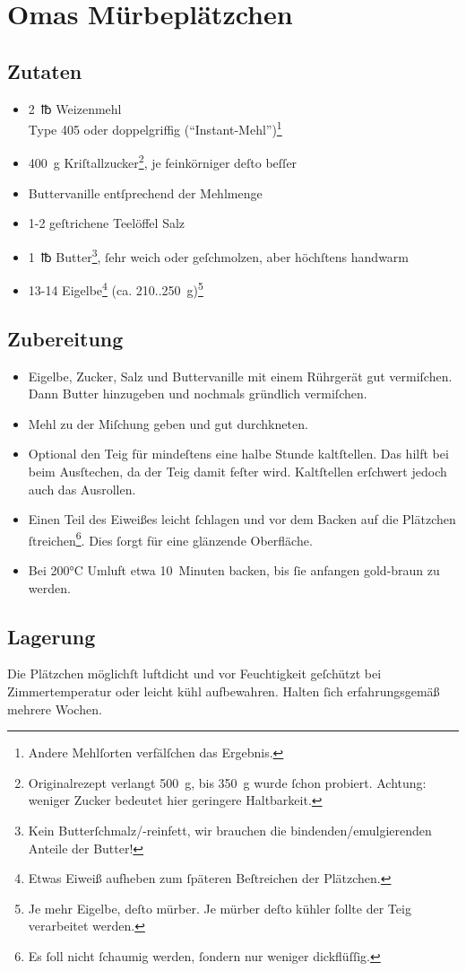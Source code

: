\documentclass[paper=A4,fontsize=12pt,DIV=18,fraktur=false]{rezepte}
\begin{document}
\section*{Omas Mürbeplätzchen}

\subsection*{Zutaten}

\begin{itemize}
    \item 2~℔ Weizenmehl\\
    Type 405 oder doppelgriffig (\enquote{Instant-Mehl})\footnote{Andere Mehlſorten verfälſchen das Ergebnis.}
    \item 400~g Kriſtallzucker\footnote{Originalrezept verlangt 500~g, bis 350~g wurde ſchon probiert. Achtung: weniger Zucker bedeutet hier geringere Haltbarkeit.}, je feinkörniger deſto beſſer
    \item Buttervanille entſprechend der Mehlmenge
    \item 1-2 geſtrichene Teelöffel Salz
    \item 1~℔ Butter\footnote{Kein Butterſchmalz/-reinfett, wir brauchen die bindenden/emulgierenden Anteile der Butter!}, ſehr weich oder geſchmolzen, aber höchſtens handwarm
    \item 13-14 Eigelbe\footnote{Etwas Eiweiß aufheben zum ſpäteren Beſtreichen der Plätzchen.} (ca. 210..250~g)\footnote{Je mehr Eigelbe, deſto mürber. Je mürber deſto kühler ſollte der Teig verarbeitet werden.}
\end{itemize}

\subsection*{Zubereitung}

\begin{itemize}
    \item Eigelbe, Zucker, Salz und Buttervanille mit einem Rührgerät gut vermiſchen. Dann Butter hinzugeben und nochmals gründlich vermiſchen.
    \item Mehl zu der Miſchung geben und gut durchkneten.
    \item Optional den Teig für mindeſtens eine halbe Stunde kaltſtellen. Das hilft bei beim Ausſtechen, da der Teig damit feſter wird. Kaltſtellen erſchwert jedoch auch das Ausrollen.
    \item Einen Teil des Eiweißes leicht ſchlagen und vor dem Backen auf die Plätzchen ſtreichen\footnote{Es ſoll nicht ſchaumig werden, ſondern nur weniger dickflüſſig.}. Dies ſorgt für eine glänzende Oberfläche.
    \item Bei 200°C Umluft etwa 10~Minuten backen, bis ſie anfangen gold-braun zu werden.
\end{itemize}

\subsection*{Lagerung}

Die Plätzchen möglichſt luftdicht und vor Feuchtigkeit geſchützt bei Zimmertemperatur oder leicht kühl aufbewahren. Halten ſich erfahrungsgemäß mehrere Wochen.
\end{document}
